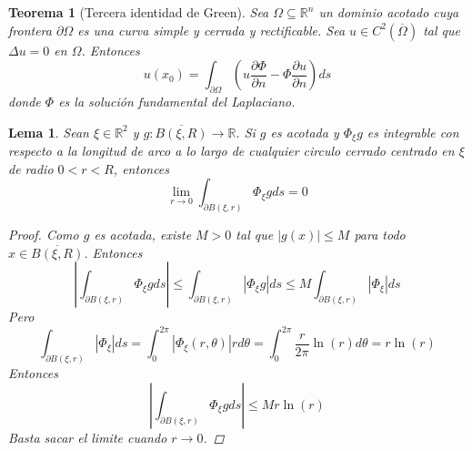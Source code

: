 \documentclass[11pt]{book}
\theoremstyle{plain}
\newtheorem{lema}[proposición]{Lema}
\newtheorem{teo}[proposición]{Teorema}
\theoremstyle{definition}
\newcommand{\R}{\mathbb{R}}
\begin{document}
    \begin{teo}[Tercera identidad de Green]
        Sea $\Omega \subseteq \R^{n}$ un dominio acotado cuya frontera $\partial \Omega$ es una curva simple y cerrada y rectificable. Sea $u \in C^{2}(\overline{\Omega})$ tal que $\Delta u = 0$ en $\Omega$. Entonces
        \[
            u(x_{0}) = \int_{\partial \Omega} \left(u \frac{\partial \Phi}{\partial n} - \Phi \frac{\partial u}{\partial n}\right)ds
        \]
        donde $\Phi$ es la solución fundamental del Laplaciano.
    \end{teo}
    \begin{lema}
        Sean $\xi \in \R^{2}$ y $g : \overline{B(\xi,R)} \to \R$. Si $g$ es acotada y $\Phi_{\xi}g$ es integrable con respecto a la longitud de arco a lo largo de cualquier circulo cerrado centrado en $\xi$ de radio $0 < r < R$, entonces
        \[
            \lim_{r \to 0} \int_{\partial B(\xi,r)} \Phi_{\xi}g ds = 0
        \]
        \begin{proof}
            Como $g$ es acotada, existe $M > 0$ tal que $|g(x)| \leq M$ para todo $x \in \overline{B(\xi,R)}$. Entonces
            \[
                \left|\int_{\partial B(\xi,r)} \Phi_{\xi}g ds\right| \leq \int_{\partial B(\xi,r)} |\Phi_{\xi}g| ds \leq M \int_{\partial B(\xi,r)} |\Phi_{\xi}| ds
            \]
            Pero
            \[
                \int_{\partial B(\xi,r)} |\Phi_{\xi}| ds = \int_{0}^{2\pi} |\Phi_{\xi}(r,\theta)| r d\theta = \int_{0}^{2\pi} \frac{r}{2\pi}\ln(r)d\theta = r\ln(r)
            \]
            Entonces
            \[
                \left|\int_{\partial B(\xi,r)} \Phi_{\xi}g ds\right| \leq M r\ln(r)
            \]
            Basta sacar el limite cuando $r \to 0$.
        \end{proof}
    \end{lema}
\end{document}
